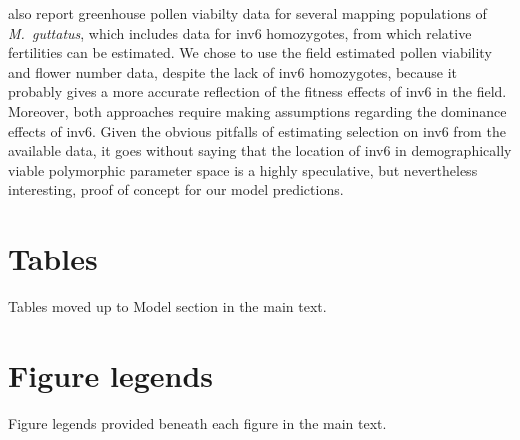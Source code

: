 \documentclass[11pt]{article}
\begin{document}
\citet{LeeKelly2015} also report greenhouse pollen viabilty data for several mapping populations of {\itshape M.~guttatus}, which includes data for inv6 homozygotes, from which relative fertilities can be estimated. We chose to use the field estimated pollen viability and flower number data, despite the lack of inv6 homozygotes, because it probably gives a more accurate reflection of the fitness effects of inv6 in the field. Moreover, both approaches require making assumptions regarding the dominance effects of inv6. Given the obvious pitfalls of estimating selection on inv6 from the available data, it goes without saying that the location of inv6 in demographically viable polymorphic parameter space is a highly speculative, but nevertheless interesting, proof of concept for our model predictions.



%
%
\newpage{}




\renewcommand\thesection{}
\renewcommand\thesubsection{}

\section{Tables}
\renewcommand{\thetable}{\arabic{table}}
\setcounter{table}{0}

Tables moved up to Model section in the main text.

\section{Figure legends}

Figure legends provided beneath each figure in the main text.
\end{document}
